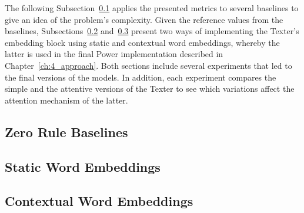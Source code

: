 The following Subsection~\ref{subsec:5_experiments/4_texter/1_zero_rule}  applies the presented metrics to several baselines to give an idea of the problem's complexity. Given the reference values from the baselines, Subsections~\ref{subsec:5_experiments/4_texter/2_static} and~\ref{subsec:5_experiments/4_texter/3_context} present two ways of implementing the Texter's embedding block using static and contextual word embeddings, whereby the latter is used in the final Power implementation described in Chapter~\ref{ch:4_approach}. Both sections include several experiments that led to the final versions of the models. In addition, each experiment compares the simple and the attentive versions of the Texter to see which variations affect the attention mechanism of the latter.

\subsection{Zero Rule Baselines}
\label{subsec:5_experiments/4_texter/1_zero_rule}


\subsection{Static Word Embeddings}
\label{subsec:5_experiments/4_texter/2_static}


\subsection{Contextual Word Embeddings}
\label{subsec:5_experiments/4_texter/3_context}

